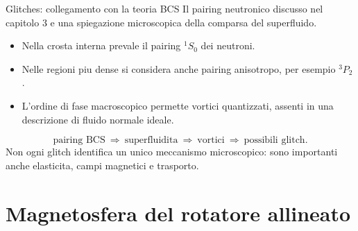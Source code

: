 \begin{frame}[t]{Glitches: collegamento con la teoria BCS}
\small
Il pairing neutronico discusso nel capitolo 3 e una spiegazione microscopica della comparsa del superfluido.
\begin{itemize}
\item Nella crosta interna prevale il pairing $^1S_0$ dei neutroni.
\item Nelle regioni piu dense si considera anche pairing anisotropo, per esempio $^3P_2$.
\item L'ordine di fase macroscopico permette vortici quantizzati, assenti in una descrizione di fluido normale ideale.
\end{itemize}
\[
\text{pairing BCS}\ \Longrightarrow\ \text{superfluidita}
\ \Longrightarrow\ \text{vortici}\ \Longrightarrow\ \text{possibili glitch}.
\]
Non ogni glitch identifica un unico meccanismo microscopico: sono importanti anche elasticita, campi magnetici e trasporto.
\end{frame}

\section{Magnetosfera del rotatore allineato}

